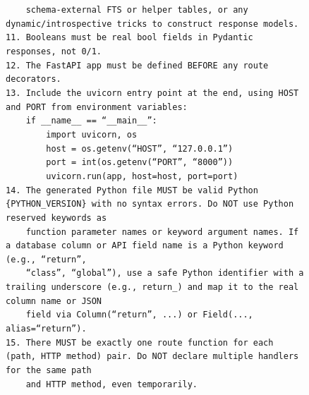 \begin{figure}[p]
{\begin{minipage}{0.97\textwidth}
        \texttt{~~~~schema-external FTS or helper tables, or any dynamic/introspective tricks to construct response models.}\\
        \texttt{11. Booleans must be real bool fields in Pydantic responses, not 0/1.}\\
        \texttt{12. The FastAPI app must be defined BEFORE any route decorators.}\\
        \texttt{13. Include the uvicorn entry point at the end, using HOST and PORT from environment variables:}\\[2pt]
        \texttt{~~~~if \_\_name\_\_ == ``\_\_main\_\_'':}\\
        \texttt{~~~~~~~~import uvicorn, os}\\
        \texttt{~~~~~~~~host = os.getenv(``HOST'', ``127.0.0.1'')}\\
        \texttt{~~~~~~~~port = int(os.getenv(``PORT'', ``8000''))}\\
        \texttt{~~~~~~~~uvicorn.run(app, host=host, port=port)}\\[2pt]
        \texttt{14. The generated Python file MUST be valid Python \{PYTHON\_VERSION\} with no syntax errors. Do NOT use Python reserved keywords as}\\
        \texttt{~~~~function parameter names or keyword argument names. If a database column or API field name is a Python keyword (e.g., ``return'',}\\
        \texttt{~~~~``class'', ``global''), use a safe Python identifier with a trailing underscore (e.g., return\_) and map it to the real column name or JSON}\\
        \texttt{~~~~field via Column(``return'', ...) or Field(..., alias=``return'').}\\
        \texttt{15. There MUST be exactly one route function for each (path, HTTP method) pair. Do NOT declare multiple handlers for the same path}\\
        \texttt{~~~~and HTTP method, even temporarily.}\\[4pt]


\end{minipage}}
\end{figure}
